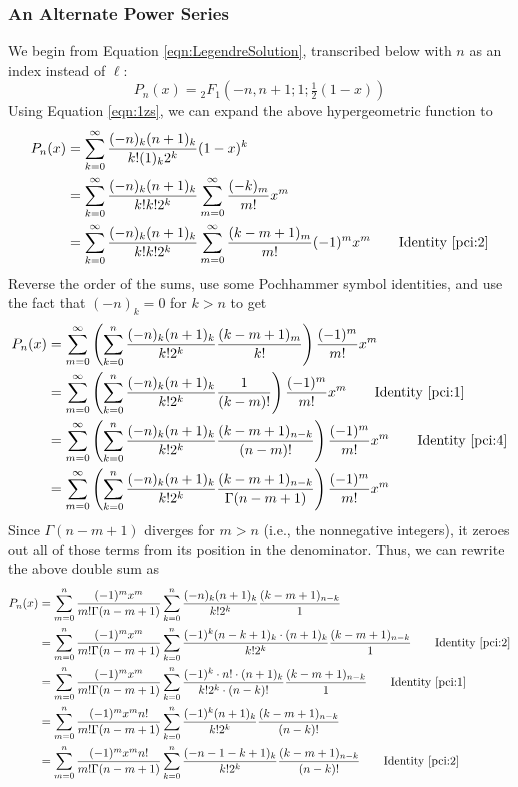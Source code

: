 \documentclass[titlepage]{article}
\numberwithin{equation}{section}
\begin{document}
\subsubsection{An Alternate Power Series}
We begin from Equation \ref{eqn:LegendreSolution}, transcribed below with $n$ as an index instead of $\ell$:
\begin{equation*}
    P_n(x) = {}_2F_1(-n,n+1;1;\tfrac{1}{2}(1-x))
\end{equation*}
Using Equation \ref{eqn:1zs}, we can expand the above hypergeometric function to
\begin{align*}
    P_n(x) &= \sum_{k=0}^\infty\frac{(-n)_k(n+1)_k}{k!(1)_k2^k}(1-x)^k\\
    &= \sum_{k=0}^\infty\frac{(-n)_k(n+1)_k}{k!k!2^k}\sum_{m=0}^\infty\frac{(-k)_m}{m!}x^m\\
    &= \sum_{k=0}^\infty\frac{(-n)_k(n+1)_k}{k!k!2^k}\sum_{m=0}^\infty\frac{(k-m+1)_m}{m!}(-1)^mx^m\tag*{Identity \ref{pci:2}}
\end{align*}
Reverse the order of the sums, use some Pochhammer symbol identities, and use the fact that $(-n)_k=0$ for $k>n$ to get
\begin{align*}
    P_n(x) &= \sum_{m=0}^\infty\left( \sum_{k=0}^n\frac{(-n)_k(n+1)_k}{k!2^k}\frac{(k-m+1)_m}{k!} \right)\frac{(-1)^m}{m!}x^m\\
    &= \sum_{m=0}^\infty\left( \sum_{k=0}^n\frac{(-n)_k(n+1)_k}{k!2^k}\frac{1}{(k-m)!} \right)\frac{(-1)^m}{m!}x^m\tag*{Identity \ref{pci:1}}\\
    &= \sum_{m=0}^\infty\left( \sum_{k=0}^n\frac{(-n)_k(n+1)_k}{k!2^k}\frac{(k-m+1)_{n-k}}{(n-m)!} \right)\frac{(-1)^m}{m!}x^m\tag*{Identity \ref{pci:4}}\\
    &= \sum_{m=0}^\infty\left( \sum_{k=0}^n\frac{(-n)_k(n+1)_k}{k!2^k}\frac{(k-m+1)_{n-k}}{\Gamma(n-m+1)} \right)\frac{(-1)^m}{m!}x^m
\end{align*}
Since $\Gamma(n-m+1)$ diverges for $m>n$ (i.e., the nonnegative integers), it zeroes out all of those terms from its position in the denominator. Thus, we can rewrite the above double sum as
\begin{align*}
    P_n(x) &= \sum_{m=0}^n\frac{(-1)^mx^m}{m!\Gamma(n-m+1)}\sum_{k=0}^n\frac{(-n)_k(n+1)_k}{k!2^k}\frac{(k-m+1)_{n-k}}{1}\\
    &= \sum_{m=0}^n\frac{(-1)^mx^m}{m!\Gamma(n-m+1)}\sum_{k=0}^n\frac{(-1)^k(n-k+1)_k\cdot(n+1)_k}{k!2^k}\frac{(k-m+1)_{n-k}}{1}\tag*{Identity \ref{pci:2}}\\
    &= \sum_{m=0}^n\frac{(-1)^mx^m}{m!\Gamma(n-m+1)}\sum_{k=0}^n\frac{(-1)^k\cdot n!\cdot(n+1)_k}{k!2^k\cdot(n-k)!}\frac{(k-m+1)_{n-k}}{1}\tag*{Identity \ref{pci:1}}\\
    &= \sum_{m=0}^n\frac{(-1)^mx^mn!}{m!\Gamma(n-m+1)}\sum_{k=0}^n\frac{(-1)^k(n+1)_k}{k!2^k}\frac{(k-m+1)_{n-k}}{(n-k)!}\\
    &= \sum_{m=0}^n\frac{(-1)^mx^mn!}{m!\Gamma(n-m+1)}\sum_{k=0}^n\frac{(-n-1-k+1)_k}{k!2^k}\frac{(k-m+1)_{n-k}}{(n-k)!}\tag*{Identity \ref{pci:2}}
\end{align*}
\end{document}
